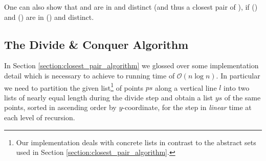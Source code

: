 \begin{isabellebody}
\begin{isamarkuptext}
\begin{lemma} \label{lemma:combine_dist}
 \vskip 0pt
 \vskip 0pt
 \vskip 0pt
 \vskip 0pt
\end{lemma}

One can also show that  and  are in  and distinct (and thus a closest pair of ),
if  () and  () are in  () and distinct.

\subsection{The Divide \& Conquer Algorithm} \label{subsection:dc:fc}

In Section \ref{section:closest_pair_algorithm} we glossed over some implementation detail which
is necessary to achieve to running time of $\mathcal{O}(n \log n)$. In particular
we need to partition the given list\footnote{Our implementation deals with
concrete lists in contrast to the abstract sets used in Section \ref{section:closest_pair_algorithm}.} of points $\mathit{ps}$
along a vertical line $l$ into two lists of nearly equal length during the divide step and obtain
a list $\mathit{ys}$ of the same points, sorted in ascending order by $y$-coordinate, for the 
step in \emph{linear} time at each level of recursion.


\end{isamarkuptext}
\end{isabellebody}
